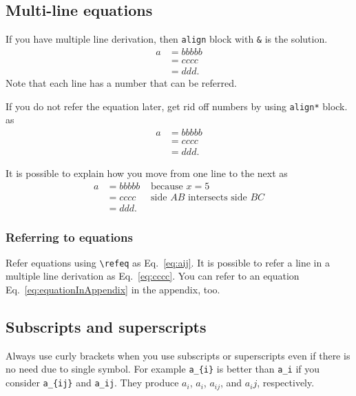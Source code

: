 \documentclass[10pt,journal,compsoc]{IEEEtran}
\newcommand{\refeq}[1]{Eq.~\ref{#1}}
\newcommand{\hCode}[1]{\texttt{{\footnotesize #1}}}
\theoremstyle{plain}
\theoremstyle{definition}
\theoremstyle{remark}
\begin{document}
{%
\subsection{Multi-line equations}

If you have multiple line derivation,
then \hCode{align} block with \verb!&! is the solution.
\begin{align}
	a 
	&= bbbbb\\
	&= cccc \label{eq:cccc}\\
	&= ddd.
\end{align}
Note that each line has a number that can be referred.

If you do not refer the equation later,
get rid off numbers by using \hCode{align*} block.
as
\begin{align*}
	a 
	&= bbbbb\\
	&= cccc\\
	&= ddd.
\end{align*}

It is possible to explain how you move from one line to the next as 
\begin{align*}
	a 
	&= bbbbb
		&\text{ because } x = 5\\
	&= cccc
		&\text{ side $AB$ intersects side $BC$}\\
	&= ddd.
\end{align*}




\subsubsection{Referring to equations}

Refer equations using \verb!\refeq! as \refeq{eq:aij}.
It is possible to refer a line in a multiple line derivation as \refeq{eq:cccc}.
You can refer to an equation \refeq{eq:equationInAppendix} in the appendix, too.




\subsection{Subscripts and superscripts}

Always use curly brackets when you use subscripts or superscripts 
even if there is no need due to single symbol.
For example \verb!a_{i}! is better than \verb!a_i! 
if you consider
\verb!a_{ij}! and \verb!a_ij!.
They produce
$a_{i}$,
$a_i$,
$a_{ij}$, and 
$a_ij$,
respectively.




}
\end{document}
